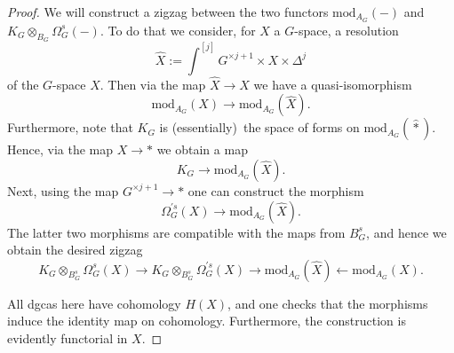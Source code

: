 \documentclass[a4paper]{amsart}
\theoremstyle{plain}
\theoremstyle{definition}
\renewcommand{\mod}{\mathrm{mod}}
\begin{document}
\begin{proof}
We will construct a zigzag between the two functors $\mod_{A_G}(-)$ and $K_G \otimes_{B_G} \Omega_G^s(-)$.
To do that we consider, for $X$ a $G$-space, a resolution 
\[
 \hat X := \int^{[j]} G^{\times j+1} \times X \times \Delta^j
\]
of the $G$-space $X$. Then via the map $\hat X\to X$ we have a quasi-isomorphism
\[
 \mod_{A_G}(X) \to \mod_{A_G}(\hat X).
\]
Furthermore, note that $K_G$ is (essentially) the space of forms on $\mod_{A_G}(\hat *)$. Hence, via the map $X\to *$ we obtain a map
\[
 K_G\to \mod_{A_G}(\hat X).
\]
Next, using the map $G^{\times j+1}\to *$ one can construct the morphism
\[
 \Omega_G^{'s}(X) \to \mod_{A_G}(\hat X).
\]
The latter two morphisms are compatible with the maps from $B_G^s$, and hence we obtain the desired zigzag
\[
 K_G\otimes_{B_G^s}\Omega_G^{s}(X)\to  K_G\otimes_{B_G^s} \Omega_G^{'s}(X) \to \mod_{A_G}(\hat X) \leftarrow \mod_{A_G}(X).
\]

All dgcas here have cohomology $H(X)$, and one checks that the morphisms induce the identity map on cohomology.
Furthermore, the construction is evidently functorial in $X$.
\end{proof}
\end{document}
